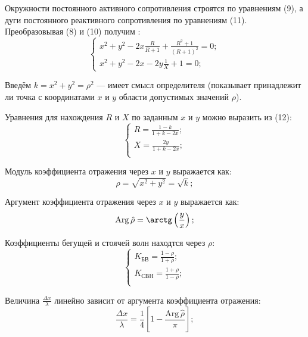 \documentclass[12pt,a4paper]{article}
\newcommand{\ds}{\displaystyle}
\renewcommand{\arg}{\mathrm{Arg}}
\newcommand{\ro}{\hat{\rho}}
\newcommand{\kb}{K_{\text{БВ}}}
\newcommand{\ks}{K_{\text{СВН}}}
\newcommand{\dxl}{\displaystyle\frac{\Delta x}{\lambda}}
\begin{document}
	Окружности постоянного активного сопротивления строятся по уравнениям (9), а
	дуги постоянного реактивного сопротивления по уравнениям (11). \\
	
	Преобразовывая (8) и (10) получим :
	\begin{equation}
		\begin{cases}
			\ds x^2 + y^2 - 2x\frac{R}{R+1} + \frac{R^2+1}{{(R+1)}^2} = 0; \\[12pt]
			\ds x^2 + y^2 - 2x - 2y\frac1X + 1 = 0;
		\end{cases}
	\end{equation}
	
	Введём $k = x^2 + y^2 = \rho^2$ \quad --- \quad имеет смысл определителя (показывает принадлежит
	ли точка с координатами $x$ и $y$ области допустимых значений $\rho$).
	
	Уравнения для нахождения $R$ и $X$ по заданным $x$ и $y$ можно выразить из (12):
	\begin{equation}
		\begin{cases}
			\ds R = \frac{1-k}{1+k-2x}; \\[12pt]
			\ds X = \frac{2y}{1+k-2x}; \\
		\end{cases}
	\end{equation}
	
	Модуль коэффициента отражения через $x$ и $y$ выражается как:
	\begin{equation}
		\rho = \sqrt{x^2 + y^2} = \sqrt{k};
	\end{equation}
	
	Аргумент коэффициента отражения через $x$ и $y$ выражается как:
	\begin{equation}
		\ds \arg\,\ro = \arctg \left( \frac{y}{x} \right);
	\end{equation}
	
	Коэффициенты бегущей и стоячей волн находтся через $\rho$:
	\begin{equation}
		\begin{cases}
			\ds \kb = \frac{1-\rho}{1+\rho}; \\[12pt]
			\ds \ks = \frac{1+\rho}{1-\rho}; \\[12pt]
		\end{cases}
	\end{equation}
	
	Величина $\dxl$ линейно зависит от аргумента коэффициента отражения:
	\begin{equation}
		\dxl = \frac14 \left[ 1 - \frac{\arg\,\ro}{\pi} \right];
	\end{equation}
	
\end{document}
